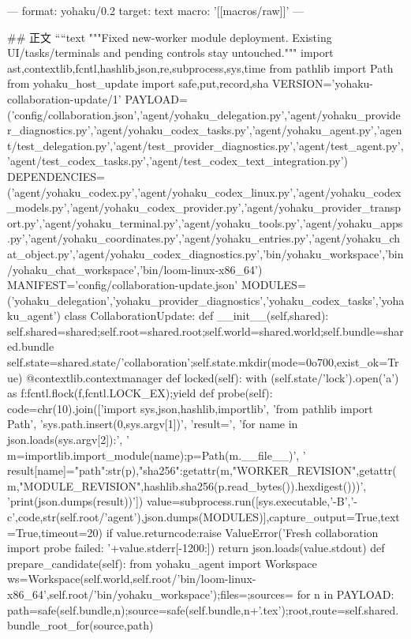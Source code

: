 ---
format: yohaku/0.2
target: text
macro: '[[macros/raw]]'
---

## 正文
````text
"""Fixed new-worker module deployment. Existing UI/tasks/terminals and pending controls stay untouched."""
import ast,contextlib,fcntl,hashlib,json,re,subprocess,sys,time
from pathlib import Path
from yohaku_host_update import safe,put,record,sha
VERSION='yohaku-collaboration-update/1'
PAYLOAD=('config/collaboration.json','agent/yohaku_delegation.py','agent/yohaku_provider_diagnostics.py','agent/yohaku_codex_tasks.py','agent/yohaku_agent.py','agent/test_delegation.py','agent/test_provider_diagnostics.py','agent/test_agent.py','agent/test_codex_tasks.py','agent/test_codex_text_integration.py')
DEPENDENCIES=('agent/yohaku_codex.py','agent/yohaku_codex_linux.py','agent/yohaku_codex_models.py','agent/yohaku_codex_provider.py','agent/yohaku_provider_transport.py','agent/yohaku_terminal.py','agent/yohaku_tools.py','agent/yohaku_apps.py','agent/yohaku_coordinates.py','agent/yohaku_entries.py','agent/yohaku_chat_object.py','agent/yohaku_codex_diagnostics.py','bin/yohaku_workspace','bin/yohaku_chat_workspace','bin/loom-linux-x86_64')
MANIFEST='config/collaboration-update.json'
MODULES=('yohaku_delegation','yohaku_provider_diagnostics','yohaku_codex_tasks','yohaku_agent')
class CollaborationUpdate:
 def __init__(self,shared):
  self.shared=shared;self.root=shared.root;self.world=shared.world;self.bundle=shared.bundle
  self.state=shared.state/'collaboration';self.state.mkdir(mode=0o700,exist_ok=True)
 @contextlib.contextmanager
 def locked(self):
  with (self.state/'lock').open('a') as f:fcntl.flock(f,fcntl.LOCK_EX);yield
 def probe(self):
  code=chr(10).join(['import sys,json,hashlib,importlib', 'from pathlib import Path', 'sys.path.insert(0,sys.argv[1])', 'result={}', 'for name in json.loads(sys.argv[2]):', ' m=importlib.import_module(name);p=Path(m.__file__)', ' result[name]={"path":str(p),"sha256":getattr(m,"WORKER_REVISION",getattr(m,"MODULE_REVISION",hashlib.sha256(p.read_bytes()).hexdigest()))}', 'print(json.dumps(result))'])
  value=subprocess.run([sys.executable,'-B','-c',code,str(self.root/'agent'),json.dumps(MODULES)],capture_output=True,text=True,timeout=20)
  if value.returncode:raise ValueError('Fresh collaboration import probe failed: '+value.stderr[-1200:])
  return json.loads(value.stdout)
 def prepare_candidate(self):
  from yohaku_agent import Workspace
  ws=Workspace(self.world,self.root/'bin/loom-linux-x86_64',self.root/'bin/yohaku_workspace');files={};sources={}
  for n in PAYLOAD:
   path=safe(self.bundle,n);source=safe(self.bundle,n+'.tex');root,route=self.shared.bundle_root_for(source,path)
